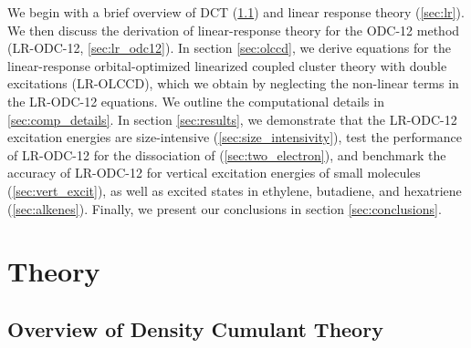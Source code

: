 We begin with a brief overview of DCT (\cref{sec:dct}) and linear response
theory (\cref{sec:lr}). We then discuss the derivation of linear-response theory
for the ODC-12 method (LR-ODC-12, \cref{sec:lr_odc12}).
In section \cref{sec:olccd}, we derive equations for the linear-response
orbital-optimized linearized coupled cluster theory with double excitations
(LR-OLCCD), which we obtain by neglecting the non-linear terms in the LR-ODC-12
equations. 
We outline the computational details in \cref{sec:comp_details}.
In section \cref{sec:results}, we demonstrate that the LR-ODC-12 excitation
energies are size-intensive (\cref{sec:size_intensivity}), test the performance
of LR-ODC-12 for the dissociation of  (\cref{sec:two_electron}), and
benchmark the accuracy of LR-ODC-12 for vertical excitation energies of small
molecules (\cref{sec:vert_excit}), as well as excited states in ethylene,
butadiene, and hexatriene (\cref{sec:alkenes}).
Finally, we present our conclusions in section \cref{sec:conclusions}. 


\section{Theory}

\subsection{Overview of Density Cumulant Theory}
\label{sec:dct}

